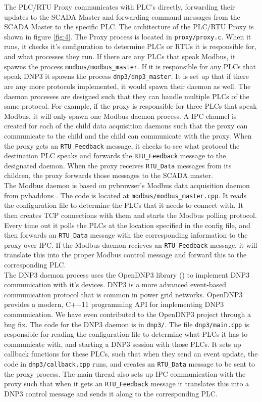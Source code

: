 \documentclass[oneside,11pt,a4paper,oldfontcommands]{book}
\def\code#1{\texttt{#1}}
\begin{document}
\indent \indent
The PLC/RTU Proxy communicates with PLC's directly, forwarding their updates
to the SCADA Master and forwarding command messages from the SCADA Master to the specific
PLC.
The architecture of the PLC/RTU Proxy is shown in figure \ref{fig:4}. The Proxy
process is located in \code{proxy/proxy.c}. When it runs, it checks it's configuration
to determine PLCs or RTUs it is responsible for, and what processes they run.
If there are any PLCs that speak Modbus, it spawns the process 
\code{modbus/modbus\_master}. If it is responsible for any PLCs that speak DNP3 it spawns
the process \code{dnp3/dnp3\_master}. It is set up that if there are any more protocols
implemented, it would spawn their daemon as well. The daemon processes are designed
such that they can handle multiple PLCs of the same protocol. For example, if the
proxy is responsible for three PLCs that speak Modbus, it will only spawn one Modbus
 daemon process. A IPC channel is created for each of the 
child data acquisition daemons such that the proxy can communicate to the child and the
child can communicate with the proxy. When the proxy gets an \code{RTU\_Feedback} message,
it checks to see what protocol the destination PLC speaks and forwards the 
\code{RTU\_Feedback} message to the designated daemon. 
When the proxy receives \code{RTU\_Data}
messages from its children, the proxy forwards those messages to the SCADA master. \\

\indent
The Modbus daemon is based on pvbrowser's Modbus data acquisition daemon
from pvbaddons \cite{pvbrowser}.
The code is located at \code{modbus/modbus\_master.cpp}. 
It reads the configuration file to determine the PLCs that it needs to connect with.
It then creates TCP connections with them and starts
the Modbus polling protocol. Every time out it polls the PLCs at the location
specified in the config file, and then forwards an \code{RTU\_Data} message with
the corresponding information to the proxy over IPC. If the Modbus daemon recieves
an \code{RTU\_Feedback} message, it will translate this into the proper Modbus
control message and forward this to the corresponding PLC. \\

\indent
The DNP3 daemon process uses the OpenDNP3 library (\cite{OpenDNP3}) to implement 
DNP3 communication with it's devices. DNP3 is a more advanced event-based communication
protocol that is common in power grid networks. OpenDNP3 provides a modern, C++11 
programming API for implementing DNP3 communication. We have even contributed
to the OpenDNP3 project through a bug fix. The code for the DNP3 daemon is in
\code{dnp3/}. The file \code{dnp3/main.cpp} is responsible for reading the configuration file
to determine what PLCs it has to communicate with, and starting a DNP3 session with 
those PLCs. It sets up callback functions for these PLCs, such that when they send an event
update, the code in \code{dnp3/callback.cpp} runs, and creates an \code{RTU\_Data}
message to be sent to the proxy process. The main thread also sets up IPC communication
with the proxy such that when it gets an \code{RTU\_Feedback} message it translates
this into a DNP3 control message and sends it along to the corresponding PLC. \\
\end{document}
